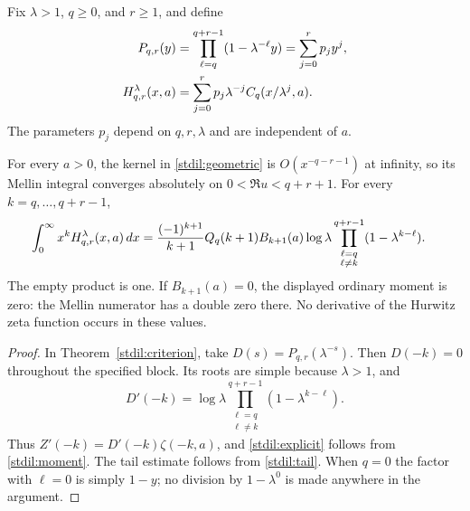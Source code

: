 Fix $\lambda>1$, $q\ge0$, and $r\ge1$, and define
\begin{align}
 P_{q,r}(y)&=\prod_{\ell=q}^{q+r-1}(1-\lambda^{-\ell}y)
            =\sum_{j=0}^rp_jy^j,\notag\\
 H_{q,r}^{\lambda}(x,a)&=
       \sum_{j=0}^r p_j\lambda^{-j}C_q(x/\lambda^j,a).
       \label{stdil:geometric}
\end{align}
The parameters $p_j$ depend on $q,r,\lambda$ and are independent of $a$.

\begin{theorem}
\label{stdil:block}
For every $a>0$, the kernel in \eqref{stdil:geometric} is
$O(x^{-q-r-1})$ at infinity, so its Mellin integral converges absolutely
on $0<\Re u<q+r+1$. For every $k=q,\ldots,q+r-1$,
\begin{align}
 \int_0^\infty x^kH_{q,r}^{\lambda}(x,a)\,dx
  &={(-1)^{k+1}\over k+1}Q_q(k+1)B_{k+1}(a)\log\lambda
       \prod_{\substack{\ell=q\\\ell\ne k}}^{q+r-1}
                  (1-\lambda^{k-\ell}).\label{stdil:explicit}
\end{align}
The empty product is one. If $B_{k+1}(a)=0$, the displayed ordinary
moment is zero: the Mellin numerator has a double zero there.
No derivative of the Hurwitz zeta function occurs in these values.
\end{theorem}
\begin{proof}
In Theorem~\ref{stdil:criterion}, take
$D(s)=P_{q,r}(\lambda^{-s})$. Then $D(-k)=0$ throughout the
specified block. Its roots are simple because $\lambda>1$, and
\[
 D'(-k)=\log\lambda
       \prod_{\substack{\ell=q\\\ell\ne k}}^{q+r-1}
                       (1-\lambda^{k-\ell}).
\]
Thus $Z'(-k)=D'(-k)\zeta(-k,a)$, and
\eqref{stdil:explicit} follows from \eqref{stdil:moment}.
The tail estimate follows from \eqref{stdil:tail}. When $q=0$ the
factor with $\ell=0$ is simply $1-y$; no division by $1-\lambda^0$
is made anywhere in the argument.
\end{proof}

